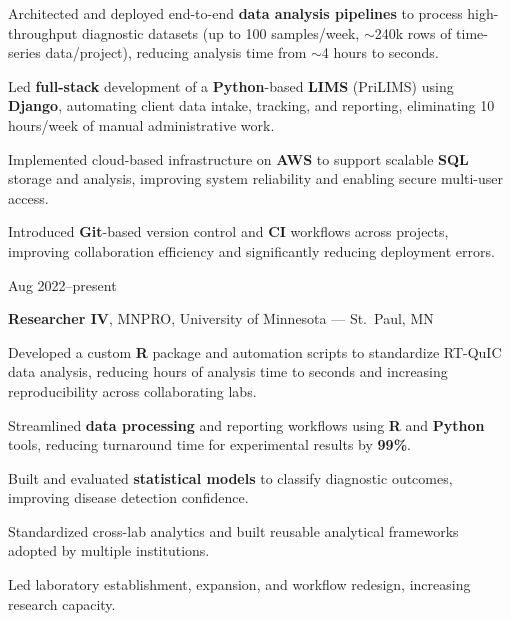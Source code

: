\documentclass{resume}
\begin{document}
\begin{onecolentry}

\begin{highlights}
    \item Architected and deployed end-to-end \textbf{data analysis pipelines} to
process high-throughput diagnostic datasets (up to 100 samples/week,
$\sim$240k rows of time-series data/project), reducing analysis time
from $\sim$4 hours to seconds.
    \item Led \textbf{full-stack} development of a \textbf{Python}-based
\textbf{LIMS} (PriLIMS) using \textbf{Django}, automating client data
intake, tracking, and reporting, eliminating 10 hours/week of manual
administrative work.
    \item Implemented cloud-based infrastructure on \textbf{AWS} to support
scalable \textbf{SQL} storage and analysis, improving system reliability
and enabling secure multi-user access.
    \item Introduced \textbf{Git}-based version control and \textbf{CI} workflows
across projects, improving collaboration efficiency and significantly
reducing deployment errors.
\end{highlights}

\end{onecolentry}

\begin{twocolentry}{Aug 2022--present}

\textbf{Researcher IV}, MNPRO, University of Minnesota --- St.~Paul, MN

\end{twocolentry}

\begin{onecolentry}

\begin{highlights}
    \item Developed a custom \textbf{R} package and automation scripts to
standardize RT-QuIC data analysis, reducing hours of analysis time to
seconds and increasing reproducibility across collaborating labs.
    \item Streamlined \textbf{data processing} and reporting workflows using
\textbf{R} and \textbf{Python} tools, reducing turnaround time for
experimental results by \textbf{99\%}.
    \item Built and evaluated \textbf{statistical models} to classify diagnostic
outcomes, improving disease detection confidence.
    \item Standardized cross-lab analytics and built reusable analytical
frameworks adopted by multiple institutions.
    \item Led laboratory establishment, expansion, and workflow redesign,
increasing research capacity.
\end{highlights}

\end{onecolentry}
\end{document}

